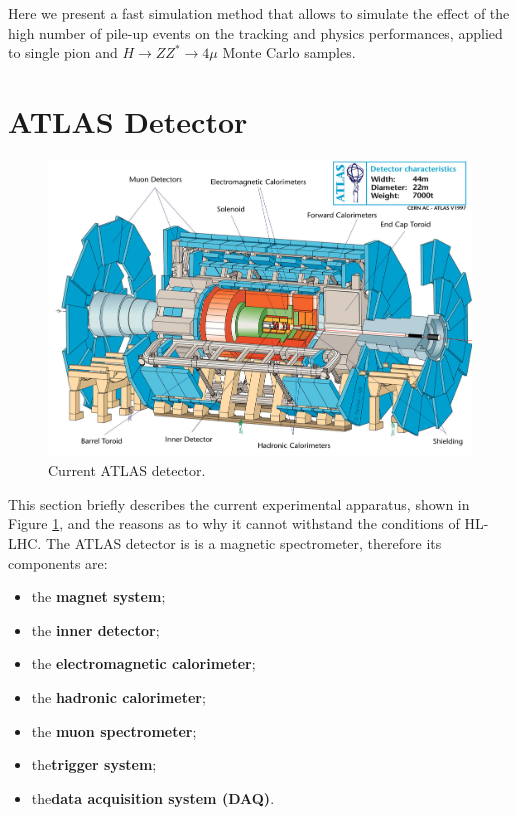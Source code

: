 \documentclass[a4paper,twoside,12pt]{article}
\begin{document}
Here we present a fast simulation method that allows to simulate the effect of the high number of pile-up events on the tracking and physics performances, applied to single pion and $H \rightarrow ZZ^{*} \rightarrow 4\mu$ Monte Carlo samples. 

\clearpage

\section{ATLAS Detector} \label{sec:detector}

\begin{figure} [h]
	\includegraphics[width=\textwidth]{atlasdet}
	\caption{Current ATLAS detector.}
	\label{fig:current_atlasdet}
\end{figure}

This section briefly describes the current experimental apparatus, shown in Figure \ref{fig:current_atlasdet}, and the reasons as to why it cannot withstand the conditions of HL-LHC. The ATLAS detector is is a magnetic spectrometer, therefore its components are:
\begin{itemize}
\item the \textbf{magnet system};
\item the \textbf{inner detector};
\item the \textbf{electromagnetic calorimeter};
\item the \textbf{hadronic calorimeter};
\item the \textbf{muon spectrometer};
\item the\textbf{trigger system};
\item the\textbf{data acquisition system (DAQ)}.
\end{itemize}
\end{document}

